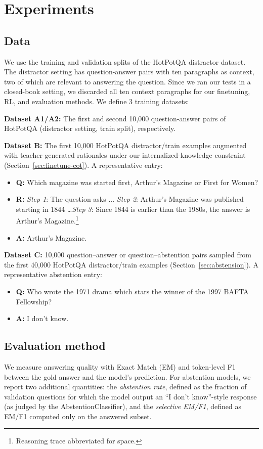 \documentclass[11pt]{article}
\begin{document}
\section{Experiments}
\subsection{Data}
We use the training and validation splits of the HotPotQA \cite{yang2018hotpotqadatasetdiverseexplainable} distractor dataset. The distractor setting has question-answer pairs with ten paragraphs as context, two of which are relevant to answering the question. Since we ran our tests in a closed-book setting, we discarded all ten context paragraphs for our finetuning, RL, and evaluation methods. We define 3 training datasets:

\textbf{Dataset A1/A2: } The first and second 10,000 question-answer pairs of HotPotQA (distractor setting, train split), respectively. 

\textbf{Dataset B:} The first 10,000 HotPotQA distractor/train examples augmented with teacher-generated rationales under our internalized-knowledge constraint (Section~\ref{sec:finetune-cot}). A representative entry:
\begin{itemize}
    \item \textbf{Q:} Which magazine was started first, Arthur's Magazine or First for Women?
    \item \textbf{R:} \emph{Step 1}: The question asks ... \emph{Step 2}: Arthur's Magazine was published starting in 1844 \dots \emph{Step 3}: Since 1844 is earlier than the 1980s, the answer is Arthur's Magazine.\footnote{Reasoning trace abbreviated for space.}
    \item \textbf{A:} Arthur's Magazine.
\end{itemize}

\textbf{Dataset C:} 10,000 question--answer or question--abstention pairs sampled from the first 40,000 HotPotQA distractor/train examples (Section~\ref{sec:abstension}). A representative abstention entry:
\begin{itemize}
    \item \textbf{Q:} Who wrote the 1971 drama which stars the winner of the 1997 BAFTA Fellowship?
    \item \textbf{A:} I don't know.
\end{itemize}

\subsection{Evaluation method}
We measure answering quality with Exact Match (EM) and token-level F1 between the gold answer and the model's prediction. For abstention models, we report two additional quantities: the \emph{abstention rate}, defined as the fraction of validation questions for which the model output an ``I don't know''-style response (as judged by the AbstentionClassifier), and the \emph{selective EM/F1}, defined as EM/F1 computed only on the answered subset.
\end{document}
